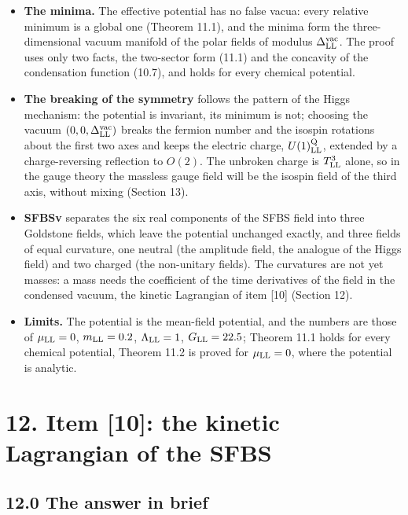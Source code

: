 \documentclass[
  10pt,
]{article}
\providecommand{\tightlist}{%
  \setlength{\itemsep}{0pt}\setlength{\parskip}{0pt}}
\begin{document}
\begin{itemize}
\tightlist
\item
  \textbf{The minima.} The effective potential has no false vacua: every
  relative minimum is a global one (Theorem 11.1), and the minima form
  the three-dimensional vacuum manifold of the polar fields of modulus
  \(\Delta^{\rm vac}_{\rm LL}\). The proof uses only two facts, the
  two-sector form (11.1) and the concavity of the condensation function
  (10.7), and holds for every chemical potential.
\item
  \textbf{The breaking of the symmetry} follows the pattern of the Higgs
  mechanism: the potential is invariant, its minimum is not; choosing
  the vacuum \((0,0,\Delta^{\rm vac}_{\rm LL})\) breaks the fermion
  number and the isospin rotations about the first two axes and keeps
  the electric charge, \(U(1)^{\rm Q}_{\rm LL}\), extended by a
  charge-reversing reflection to \(O(2)\). The unbroken charge is
  \(T^3_{\rm LL}\) alone, so in the gauge theory the massless gauge
  field will be the isospin field of the third axis, without mixing
  (Section 13).
\item
  \textbf{SFBSv} separates the six real components of the SFBS field
  into three Goldstone fields, which leave the potential unchanged
  exactly, and three fields of equal curvature, one neutral (the
  amplitude field, the analogue of the Higgs field) and two charged (the
  non-unitary fields). The curvatures are not yet masses: a mass needs
  the coefficient of the time derivatives of the field in the condensed
  vacuum, the kinetic Lagrangian of item {[}10{]} (Section 12).
\item
  \textbf{Limits.} The potential is the mean-field potential, and the
  numbers are those of \(\mu_{\rm LL}=0\), \(m_{\rm LL}=0.2\),
  \(\Lambda_{\rm LL}=1\), \(G_{\rm LL}=22.5\); Theorem 11.1 holds for
  every chemical potential, Theorem 11.2 is proved for
  \(\mu_{\rm LL}=0\), where the potential is analytic.
\end{itemize}

\hypertarget{item-10-the-kinetic-lagrangian-of-the-sfbs}{%
\section{12. Item {[}10{]}: the kinetic Lagrangian of the
SFBS}\label{item-10-the-kinetic-lagrangian-of-the-sfbs}}

\hypertarget{the-answer-in-brief-10}{%
\subsection{12.0 The answer in brief}\label{the-answer-in-brief-10}}
\end{document}
